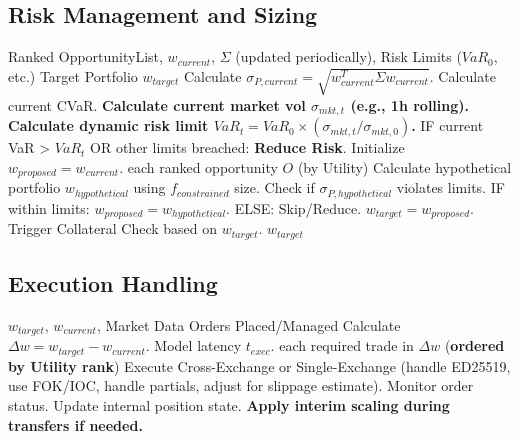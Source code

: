 \documentclass{article}
\begin{document}
\subsection{Risk Management and Sizing}
\begin{algorithm}
\caption{Risk Management and Sizing (Dynamic Limits)}
\begin{algorithmic}[1]
\REQUIRE Ranked OpportunityList, $w_{current}$, $\Sigma$ (updated periodically), Risk Limits ($VaR_0$, etc.)
\ENSURE Target Portfolio $w_{target}$
\STATE Calculate $\sigma_{P, current} = \sqrt{w_{current}^T \Sigma w_{current}}$. Calculate current CVaR.
\STATE \textbf{Calculate current market vol $\sigma_{mkt,t}$ (e.g., 1h rolling).}
\STATE \textbf{Calculate dynamic risk limit $VaR_t = VaR_0 \times (\sigma_{mkt,t} / \sigma_{mkt,0})$.}
\STATE IF current VaR > $VaR_t$ OR other limits breached: \textbf{Reduce Risk}.
\STATE Initialize $w_{proposed} = w_{current}$.
\FOR each ranked opportunity $O$ (by Utility)
    \STATE Calculate hypothetical portfolio $w_{hypothetical}$ using $f_{constrained}$ size.
    \STATE Check if $\sigma_{P, hypothetical}$ violates limits.
    \STATE IF within limits: $w_{proposed} = w_{hypothetical}$. ELSE: Skip/Reduce.
\ENDFOR
\STATE $w_{target} = w_{proposed}$.
\STATE Trigger Collateral Check based on $w_{target}$.
\RETURN $w_{target}$
\end{algorithmic}
\end{algorithm}

\subsection{Execution Handling}
\begin{algorithm}
\caption{Execution Handling (Utility Ranked)}
\begin{algorithmic}[1]
\REQUIRE $w_{target}$, $w_{current}$, Market Data
\ENSURE Orders Placed/Managed
\STATE Calculate $\Delta w = w_{target} - w_{current}$.
\STATE Model latency $t_{exec}$.
\FOR each required trade in $\Delta w$ (\textbf{ordered by Utility rank})
    \STATE Execute Cross-Exchange or Single-Exchange (handle ED25519, use FOK/IOC, handle partials, adjust for slippage estimate).
    \STATE Monitor order status.
    \STATE Update internal position state.
    \STATE \textbf{Apply interim scaling during transfers if needed.}
\ENDFOR
\end{algorithmic}
\end{algorithm}
\end{document}
